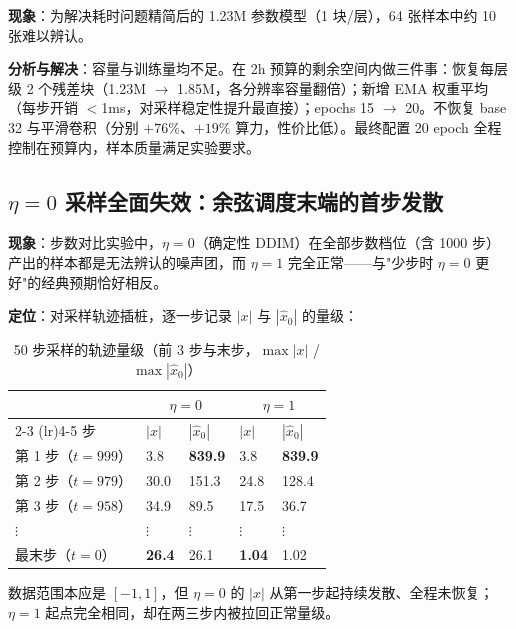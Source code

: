 \documentclass[11pt]{article}
\begin{document}
\textbf{现象}：为解决耗时问题精简后的 1.23M 参数模型（1 块/层），64 张样本中约 10 张难以辨认。

\textbf{分析与解决}：容量与训练量均不足。在 2h 预算的剩余空间内做三件事：恢复每层级 2 个残差块（1.23M $\rightarrow$ 1.85M，各分辨率容量翻倍）；新增 EMA 权重平均（每步开销 $<$1ms，对采样稳定性提升最直接）；epochs 15 $\rightarrow$ 20。不恢复 base 32 与平滑卷积（分别 $+76\%$、$+19\%$ 算力，性价比低）。最终配置 20 epoch 全程控制在预算内，样本质量满足实验要求。

\subsection{\texorpdfstring{$\eta=0$}{eta=0} 采样全面失效：余弦调度末端的首步发散}
\label{sec:eta0-failure}

\textbf{现象}：步数对比实验中，$\eta=0$（确定性 DDIM）在全部步数档位（含 1000 步）产出的样本都是无法辨认的噪声团，而 $\eta=1$ 完全正常——与"少步时 $\eta=0$ 更好"的经典预期恰好相反。

\textbf{定位}：对采样轨迹插桩，逐一步记录 $|x|$ 与 $|\hat{x}_0|$ 的量级：

\begin{table}[h]
    \centering
    \caption{50 步采样的轨迹量级（前 3 步与末步，$\max|x|$ / $\max|\hat{x}_0|$）}
    \label{tab:eta0-diag}
    \begin{tabular}{l l l l l}
        \toprule
        & \multicolumn{2}{c}{$\eta=0$} & \multicolumn{2}{c}{$\eta=1$} \\
        \cmidrule(lr){2-3} \cmidrule(lr){4-5}
        步 & $|x|$ & $|\hat{x}_0|$ & $|x|$ & $|\hat{x}_0|$ \\
        \midrule
        第 1 步（$t=999$） & 3.8 & \textbf{839.9} & 3.8 & \textbf{839.9} \\
        第 2 步（$t=979$） & 30.0 & 151.3 & 24.8 & 128.4 \\
        第 3 步（$t=958$） & 34.9 & 89.5 & 17.5 & 36.7 \\
        $\vdots$ & $\vdots$ & $\vdots$ & $\vdots$ & $\vdots$ \\
        最末步（$t=0$） & \textbf{26.4} & 26.1 & \textbf{1.04} & 1.02 \\
        \bottomrule
    \end{tabular}
\end{table}

数据范围本应是 $[-1,1]$，但 $\eta=0$ 的 $|x|$ 从第一步起持续发散、全程未恢复；$\eta=1$ 起点完全相同，却在两三步内被拉回正常量级。
\end{document}
